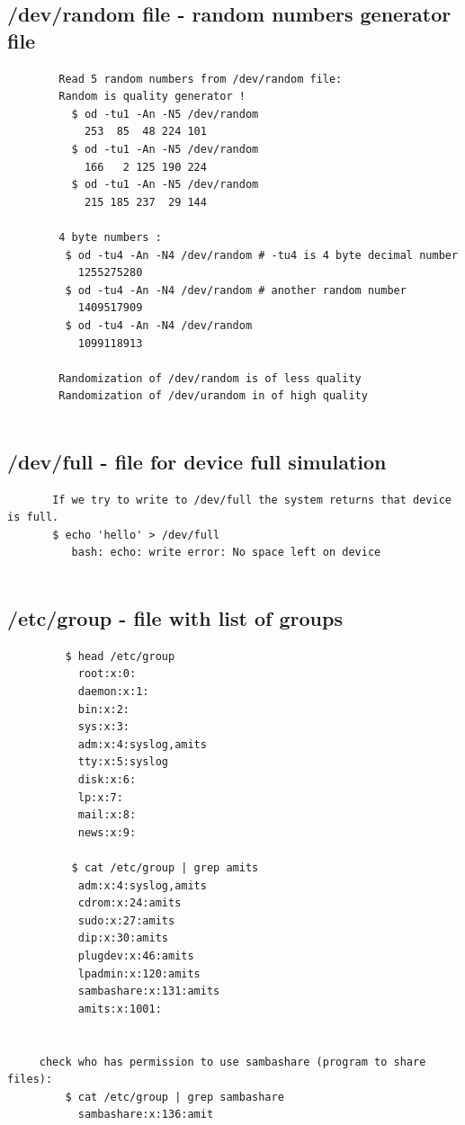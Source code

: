 \documentclass[a4paper,12pt]{article}
\begin{document}
\subsection{/dev/random file - random numbers generator file}
\begin{verbatim}
        Read 5 random numbers from /dev/random file:
        Random is quality generator !
          $ od -tu1 -An -N5 /dev/random
            253  85  48 224 101
          $ od -tu1 -An -N5 /dev/random
            166   2 125 190 224
          $ od -tu1 -An -N5 /dev/random
            215 185 237  29 144
﻿
        ﻿4 byte numbers :
         $ od -tu4 -An -N4 /dev/random # -tu4 is 4 byte decimal number
           1255275280
         $ od -tu4 -An -N4 /dev/random # another random number
           1409517909
         $ od -tu4 -An -N4 /dev/random
           1099118913

        Randomization of /dev/random is of less quality
        Randomization of /dev/urandom in of high quality
         
\end{verbatim}


\subsection{/dev/full - file for device full simulation }
\begin{verbatim}
       If we try to write to /dev/full the system returns that device is full. 
       $ echo 'hello' > /dev/full
          bash: echo: write error: No space left on device
         
\end{verbatim}



\subsection{/etc/group - file with list of groups }
\begin{verbatim}
         $ head /etc/group
           root:x:0:
           daemon:x:1:
           bin:x:2:
           sys:x:3:
           adm:x:4:syslog,amits
           tty:x:5:syslog
           disk:x:6:
           lp:x:7:
           mail:x:8:
           news:x:9:

          $ cat /etc/group | grep amits
           adm:x:4:syslog,amits
           cdrom:x:24:amits
           sudo:x:27:amits
           dip:x:30:amits
           plugdev:x:46:amits
           lpadmin:x:120:amits
           sambashare:x:131:amits
           amits:x:1001:


     check who has permission to use sambashare (program to share files):
         $ cat /etc/group | grep sambashare
           sambashare:x:136:amit
\end{verbatim}
\end{document}
